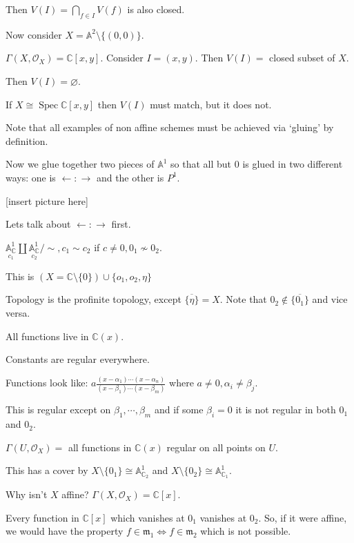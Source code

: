 \documentclass{article}
\theoremstyle{definition}
\begin{document}
    Then \(V(I) = \bigcap_{f\in I} V(f)\) is also closed.

    Now consider \(X = \mathbb{A}^2 \setminus \{ (0,0) \} \).

    \(\Gamma (X, \mathcal{O}_X) = \mathbb{C} [x,y]\). Consider \(I = (x,y)\). Then \(V(I) =\) closed subset of \(X\).

    Then \(V(I) = \varnothing\). 

    If \(X \cong \operatorname{Spec} \mathbb{C} [x,y]\) then \(V(I)\) must match, but it does not.
    
    Note that all examples of non affine schemes must be achieved via `gluing' by definition.

    Now we glue together two pieces of \(\mathbb{A}^1\) so that all but \(0\) is glued in two different ways: one is \(\longleftarrow:\longrightarrow\) and the other is \(P^1\).

    [insert picture here]

    Lets talk about \(\longleftarrow:\longrightarrow\) first.

    \(\underset{c_1}{\mathbb{A}^1_{\mathbb{C}}} \coprod \underset{c_2}{\mathbb{A}^1_{\mathbb{C}}} / \sim, c_1 \sim c_2\) if \(c \neq 0, 0_1 \not\sim 0_2\).

    This is \((X = \mathbb{C} \setminus \{ 0 \}) \cup \{ o_1, o_2, \eta \} \) 

    Topology is the profinite topology, except \(\overline{\{ \eta \} } = X\). Note that \(0_2 \notin \overline{\{ 0_1 \} } \) and vice versa.

    All functions live in \(\mathbb{C}(x)\). 

    Constants are regular everywhere.

    Functions look like: \(a \frac{(x - \alpha_1) \cdots (x - \alpha_n)}{(x - \beta_1) \cdots (x - \beta_m)}\) where \(a\neq 0, \alpha_i \neq \beta_j\).

    This is regular except on \(\beta_1, \cdots, \beta_m\) and if some \(\beta_i = 0\) it is not regular in both \(0_1\) and \(0_2\).

    \(\Gamma(U, \mathcal{O}_X) =\) all functions in \(\mathbb{C}(x)\) regular on all points on \(U\).

    This has a cover by \(X \setminus \{ 0_1 \} \cong \mathbb{A}^1_{\mathbb{C}_2}\) and \(X \setminus \{ 0_2 \}\cong \mathbb{A}^1_{\mathbb{C}_1}\).

    Why isn't \(X\) affine? \(\Gamma(X, \mathcal{O}_X) = \mathbb{C} [x]\).

    Every function in \(\mathbb{C}[x]\) which vanishes at \(0_1\) vanishes at \(0_2\). So, if it were affine, we would have the property \(f\in \mathfrak{m}_1 \iff f \in \mathfrak{m}_2\) which is not possible.
    
\end{document}
